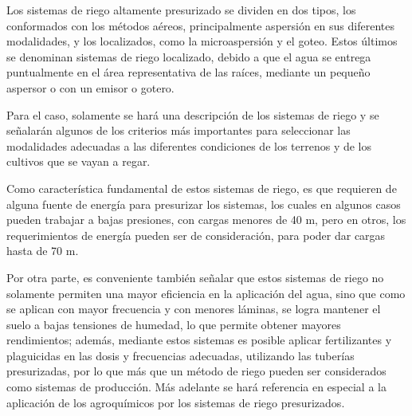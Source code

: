 Los sistemas de riego altamente presurizado se dividen en dos tipos, los
conformados con los métodos aéreos, principalmente aspersión en sus diferentes
modalidades, y los localizados, como la microaspersión y el goteo. Estos últimos se
denominan sistemas de riego localizado, debido a que el agua se entrega puntualmente
en el área representativa de las raíces, mediante un pequeño aspersor o con un emisor
o gotero.

Para el caso, solamente se hará una descripción de los sistemas de riego y se
señalarán algunos de los criterios más importantes para seleccionar las modalidades
adecuadas a las diferentes condiciones de los terrenos y de los cultivos que se vayan a
regar.

Como característica fundamental de estos sistemas de riego, es que requieren
de alguna fuente de energía para presurizar los sistemas, los cuales en algunos casos
pueden trabajar a bajas presiones, con cargas menores de 40 m, pero en otros, los
requerimientos de energía pueden ser de consideración, para poder dar cargas hasta
de 70 m.

Por otra parte, es conveniente también señalar que estos sistemas de riego no
solamente permiten una mayor eficiencia en la aplicación del agua, sino que como se
aplican con mayor frecuencia y con menores láminas, se logra mantener el suelo a
bajas tensiones de humedad, lo que permite obtener mayores rendimientos; además,
mediante estos sistemas es posible aplicar fertilizantes y plaguicidas en las dosis y
frecuencias adecuadas, utilizando las tuberías presurizadas, por lo que más que un
método de riego pueden ser considerados como sistemas de producción. Más adelante
se hará referencia en especial a la aplicación de los agroquímicos por los sistemas de
riego presurizados.

